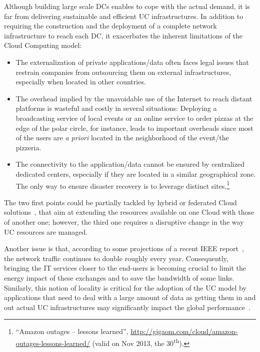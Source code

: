 \documentclass[11pt,a4paper,twoside]{article}
\begin{document}
Although building large scale DCs  enables to cope with the actual demand,
it is far from delivering sustainable and efficient UC infrastructures. In addition to
requiring the construction and the deployment of a complete network infrastructure to
reach each DC, it exacerbates the inherent limitations of the Cloud Computing model:

\begin{itemize}
\item The externalization of private applications/data often faces legal issues that
  restrain companies from outsourcing them on external infrastructures, especially when
  located in other countries.
\item The overhead implied by the unavoidable use of the Internet to reach distant
  platforms is wasteful and costly in several situations: Deploying a broadcasting service
  of local events or an online service to order pizzas at the edge of the polar circle,
  for instance, leads to important overheads since most of the users are \emph{a priori}
  located in the neighborhood of the event/the pizzeria.
\item The connectivity to the application/data cannot be ensured by centralized dedicated
  centers, especially if they are located in a similar geographical zone. The only way to
  ensure disaster recovery is to leverage distinct sites.\footnote{``Amazon outages –
    lessons learned'',
    \href{http://gigaom.com/cloud/amazon-outages-lessons-learned/}{http://gigaom.com/cloud/amazon-outages-lessons-learned/}
    (valid on Nov 2013, the 30\textsuperscript{th}).}
\end{itemize}

The two first points could be partially tackled by hybrid or federated Cloud
solutions~\cite{armbrust:2010}, that aim at extending the resources available on one Cloud
with those of another one; however, the third one requires a disruptive change in the way
UC resources are managed.

Another issue is that, according to some projections of a recent IEEE
report~\cite{ieeenetreport:2012}, the network traffic continues to double roughly every
year. Consequently, bringing the IT services closer to the end-users is becoming crucial
to limit the energy impact of these exchanges and to save the bandwidth of some
links. Similarly, this notion of locality is critical for the adoption of the UC
model by applications that need to deal with a large amount of data as getting them in and
out actual UC infrastructures may significantly impact the global
performance~\cite{Fos11}.
\end{document}
